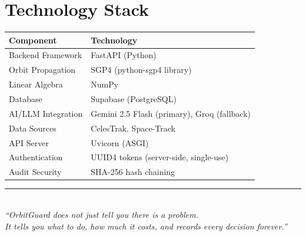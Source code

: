 \documentclass[12pt,a4paper]{article}
\begin{document}
\section{Technology Stack}

\begin{center}
\begin{tabular}{ll}
\toprule
\textbf{Component} & \textbf{Technology} \\
\midrule
Backend Framework & FastAPI (Python) \\
Orbit Propagation & SGP4 (python-sgp4 library) \\
Linear Algebra & NumPy \\
Database & Supabase (PostgreSQL) \\
AI/LLM Integration & Gemini 2.5 Flash (primary), Groq (fallback) \\
Data Sources & CelesTrak, Space-Track \\
API Server & Uvicorn (ASGI) \\
Authentication & UUID4 tokens (server-side, single-use) \\
Audit Security & SHA-256 hash chaining \\
\bottomrule
\end{tabular}
\end{center}

\vspace{1cm}
\begin{center}
\rule{0.5\textwidth}{0.5pt}\\[0.5cm]
\textit{``OrbitGuard does not just tell you there is a problem.\\It tells you what to do, how much it costs, and records every decision forever.''}
\end{center}
\end{document}
